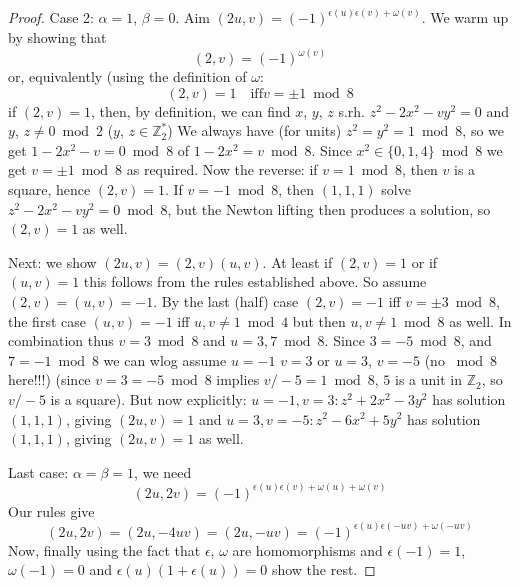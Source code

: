 \begin{proof}
  Case 2: $\alpha = 1$, $\beta = 0$. Aim $(2u, v) = (-1)^{\epsilon(u)\epsilon(v)+\omega(v)}$. We warm up by showing that
  $$(2, v) = (-1)^{\omega(v)}$$
  or, equivalently (using the definition of $\omega$:
  $$(2, v)=1 \quad\text{iff} v=\pm1\bmod 8$$
  if $(2, v) = 1$, then, by definition, we can find $x$, $y$, $z$ s.rh.
  $z^2-2x^2-vy^2 = 0$ and $y$, $z\ne0\bmod 2$ ($y$, $z\in \mathbb Z_2^*$)
  We always have (for units) $z^2 = y^2 = 1\bmod 8$, so we get
  $1 - 2x^2-v=0\bmod 8$ of $1-2x^2 = v\bmod 8$. Since $x^2\in\{0, 1, 4\}\bmod 8$
  we get $v=\pm 1\bmod 8$ as required. Now the reverse: if $v=1\bmod 8$,
  then $v$ is a square, hence $(2, v) = 1$. If $v=-1\bmod 8$, then
  $(1,1,1)$ solve $z^2-2x^2-vy^2=0\bmod 8$, but the Newton lifting
  then produces a solution, so $(2, v) = 1$ as well.

  Next: we show $(2u, v) = (2, v)(u, v)$. At least if $(2, v)=1$ or if 
  $(u,v) = 1$ this follows from the rules established above. So assume
  $(2,v) = (u,v) = -1$. By the last (half) case $(2, v) = -1$ iff
  $v=\pm 3\bmod 8$, the first case $(u,v)=-1$ iff $u, v\ne 1\bmod 4$
  but then $u, v\ne 1\bmod 8$ as well. In combination thus
  $v=3\bmod 8$ and $u=3, 7\bmod 8$. Since $3=-5\bmod 8$, and $7=-1\bmod 8$
  we can wlog assume $u=-1$ $v=3$ or $u=3$, $v=-5$ (no $\bmod 8$ here!!!)
  (since $v=3=-5\bmod 8$ implies $v/-5 = 1\bmod 8$, $5$ is a unit in $\mathbb Z_2$, so $v/-5$ is a square). But now explicitly:
  $u=-1, v=3: z^2+2x^2-3y^2$ has solution $(1,1,1)$, giving $(2u, v) = 1$
  and
  $u=3, v=-5: z^2-6x^2+5y^2$ has solution $(1, 1, 1)$, giving $(2u, v) = 1$
  as well.

  Last case: $\alpha = \beta= 1$, we need
  $$(2u, 2v) = (-1)^{\epsilon(u)\epsilon(v)+\omega(u) + \omega(v)}$$
  Our rules give
  $$(2u, 2v) = (2u, -4uv) = (2u, -uv) = (-1)^{\epsilon(u)\epsilon(-uv) + \omega(-uv)}$$
  Now, finally using the fact that $\epsilon$, $\omega$ are homomorphisms
  and $\epsilon(-1) = 1$, $\omega(-1)= 0$ and $\epsilon(u)(1+\epsilon(u)) = 0$
  show the rest.
\end{proof}

